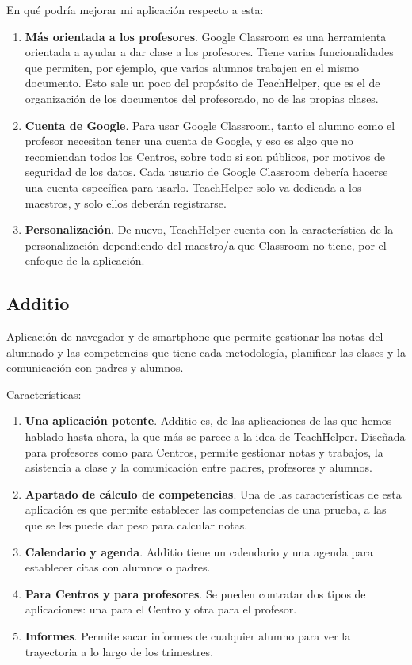 En qué podría mejorar mi aplicación respecto a esta:

\begin{enumerate}
	\item \textbf{Más orientada a los profesores}. Google Classroom es una herramienta orientada a ayudar a dar clase a los profesores. Tiene varias funcionalidades que permiten, por ejemplo, que varios alumnos trabajen en el mismo documento. Esto sale un poco del propósito de TeachHelper, que es el de organización de los documentos del profesorado, no de las propias clases.
	\item \textbf{Cuenta de Google}. Para usar Google Classroom, tanto el alumno como el profesor necesitan tener una cuenta de Google, y eso es algo que no recomiendan todos los Centros, sobre todo si son públicos, por motivos de seguridad de los datos. Cada usuario de Google Classroom debería hacerse una cuenta específica para usarlo. TeachHelper solo va dedicada a los maestros, y solo ellos deberán registrarse.
	\item \textbf{Personalización}. De nuevo, TeachHelper cuenta con la característica de la personalización dependiendo del maestro/a que Classroom no tiene, por el enfoque de la aplicación.
\end{enumerate}
	

\subsection{Additio}

Aplicación de navegador y de smartphone que permite gestionar las notas del alumnado y las competencias que tiene cada metodología, planificar las clases y la comunicación con padres y alumnos.

Características:

\begin{enumerate}
	\item \textbf{Una aplicación potente}. Additio es, de las aplicaciones de las que hemos hablado hasta ahora, la que más se parece a la idea de TeachHelper. Diseñada para profesores como para Centros, permite gestionar notas y trabajos, la asistencia a clase y la comunicación entre padres, profesores y alumnos. 
	\item \textbf{Apartado de cálculo de competencias}. Una de las características de esta aplicación es que permite establecer las competencias de una prueba, a las que se les puede dar peso para calcular notas.
	\item \textbf{Calendario y agenda}. Additio tiene un calendario y una agenda para establecer citas con alumnos o padres.
	\item \textbf{Para Centros y para profesores}. Se pueden contratar dos tipos de aplicaciones: una para el Centro y otra para el profesor.
	\item \textbf{Informes}. Permite sacar informes de cualquier alumno para ver la trayectoria a lo largo de los trimestres.
\end{enumerate}

